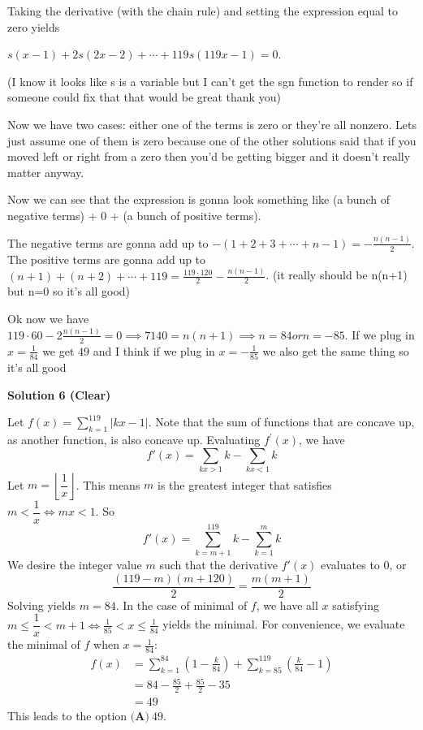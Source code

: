 \begin{enumerate}
 Taking the derivative (with the chain rule) and setting the expression equal to zero yields

 $s(x-1) + 2s(2x-2) + \cdots + 119s(119x-1) = 0$.

 (I know it looks like s is a variable but I can't get the sgn function to render so if someone could fix that that would be great thank you)

 
Now we have two cases: either one of the terms is zero or they're all nonzero. Lets just assume one of them is zero because one of the other solutions said that if you moved left or right from a zero then you'd be getting bigger and it doesn't really matter anyway. 

 Now we can see that the expression is gonna look something like (a bunch of negative terms) + 0 + (a bunch of positive terms). 

 The negative terms are gonna add up to $-(1 + 2 + 3 + \cdots + n-1) = -\frac{n(n-1)}{2}$. The positive terms are gonna add up to $(n+1) + (n+2) + \cdots + 119 = \frac{119 \cdot 120}{2} - \frac{n(n-1)}{2}$. (it really should be n(n+1) but n=0 so it's all good)

 Ok now we have $119 \cdot 60 - 2\frac{n(n-1)}{2} = 0 \implies 7140 = n(n+1) \implies n = 84 or n = -85$. If we plug in $x=\frac{1}{84}$ we get $\boxed{49}$ and I think if we plug in $x = -\frac{1}{85}$ we also get the same thing so it's all good

 



\textbf{Solution 6 (Clear)}

Let $f(x)=\sum_{k=1}^{119}\lvert kx-1\rvert$. Note that the sum of functions that are concave up, as another function, is also concave up. Evaluating $f^\prime(x)$, we have
 \[f'(x)=\sum_{kx> 1}k -\sum_{kx<1}k\]Let $m=\left\lfloor \dfrac 1x\right\rfloor$. This means $m$ is the greatest integer that satisfies $m < \dfrac 1x \iff mx < 1$. So
 \[f'(x)= \sum_{k=m+1}^{119}k -\sum_{k=1}^m k\]We desire the integer value $m$ such that the derivative $f'(x)$ evaluates to $0$, or
 \[\frac{(119-m)(m+120)}{2}=\frac{m(m+1)}{2}\]Solving yields $m=84$. In the case of minimal of $f$, we have all $x$ satisfying $m\le \dfrac 1x < m+1\iff \frac{1}{85} < x \le \frac{1}{84}$ yields the minimal. For convenience, we evaluate the minimal of $f$ when $x=\frac{1}{84}$:\begin{align*}f(x)&=\sum_{k=1}^{84}\left(1-\frac{k}{84}\right)+\sum_{k=85}^{119}\left(\frac{k}{84}-1\right)\\&=84-\frac{85}{2}+\frac{85}{2}-35\\&=49\end{align*}
This leads to the option $\boxed{\textbf{(A)}\ 49}$.


\end{enumerate}
